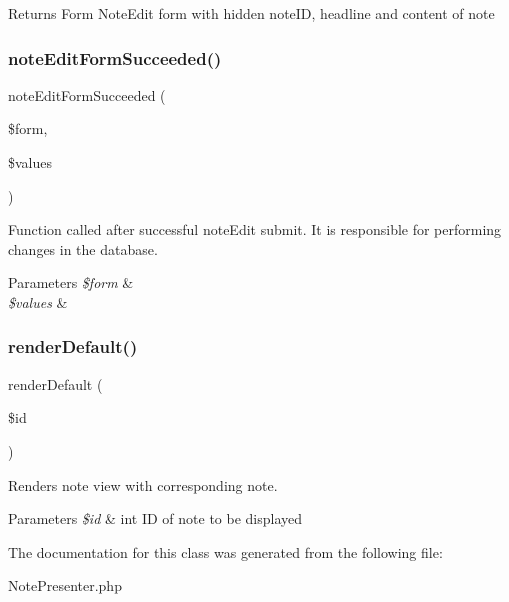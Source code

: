 \begin{DoxyReturn}{Returns}
Form Note\+Edit form with hidden note\+ID, headline and content of note 
\end{DoxyReturn}
\mbox{\label{class_app_1_1_presenters_1_1_note_presenter_a31fc3d689c7087bb9650b232ce35cca3}} 
\subsubsection{\texorpdfstring{note\+Edit\+Form\+Succeeded()}{noteEditFormSucceeded()}}
{\footnotesize\ttfamily note\+Edit\+Form\+Succeeded (\begin{DoxyParamCaption}\item[{}]{\$form,  }\item[{}]{\$values }\end{DoxyParamCaption})}

Function called after successful note\+Edit submit. It is responsible for performing changes in the database.


\begin{DoxyParams}{Parameters}
{\em \$form} & \\
\hline
{\em \$values} & \\
\hline
\end{DoxyParams}
\mbox{\label{class_app_1_1_presenters_1_1_note_presenter_ac57e2ee064c6a891f41051ef6e116c1f}} 
\subsubsection{\texorpdfstring{render\+Default()}{renderDefault()}}
{\footnotesize\ttfamily render\+Default (\begin{DoxyParamCaption}\item[{}]{\$id }\end{DoxyParamCaption})}

Renders note view with corresponding note.


\begin{DoxyParams}{Parameters}
{\em \$id} & int ID of note to be displayed \\
\hline
\end{DoxyParams}


The documentation for this class was generated from the following file\+:\begin{DoxyCompactItemize}
\item 
Note\+Presenter.\+php\end{DoxyCompactItemize}
